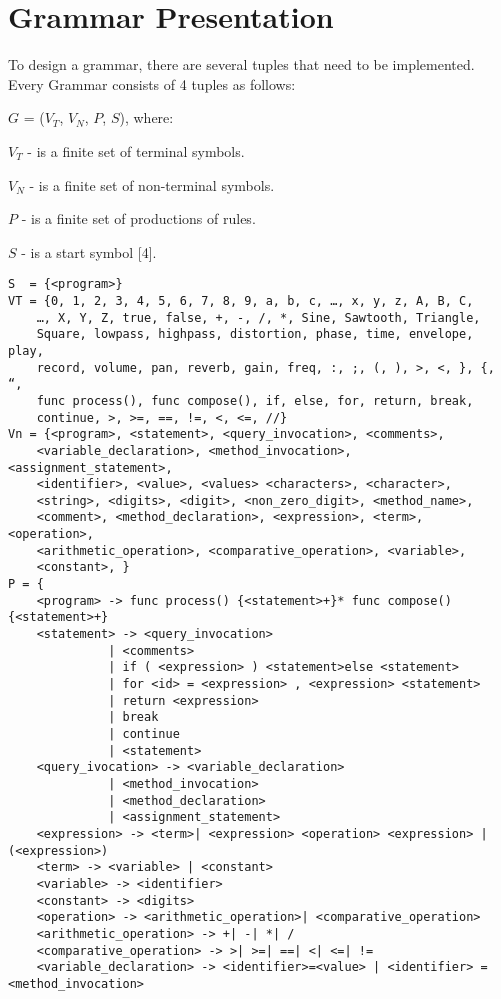 \chapter{Grammar Presentation}
To design a grammar, there are several tuples that need to be implemented. Every Grammar consists of 4 tuples as follows:

$G$ = ($V_T$, $V_N$, $P$, $S$), where:

$V_T$ - is a finite set of terminal symbols.

$V_N$ - is a finite set of non-terminal symbols.

$P$ - is a finite set of productions of rules. 

$S$ - is a start symbol [4].

\begin{verbatim}
S  = {<program>}
VT = {0, 1, 2, 3, 4, 5, 6, 7, 8, 9, a, b, c, …, x, y, z, A, B, C, 
    …, X, Y, Z, true, false, +, -, /, *, Sine, Sawtooth, Triangle, 
    Square, lowpass, highpass, distortion, phase, time, envelope, play, 
    record, volume, pan, reverb, gain, freq, :, ;, (, ), >, <, }, {, “, 
    func process(), func compose(), if, else, for, return, break, 
    continue, >, >=, ==, !=, <, <=, //}
Vn = {<program>, <statement>, <query_invocation>, <comments>, 
    <variable_declaration>, <method_invocation>, <assignment_statement>, 
    <identifier>, <value>, <values> <characters>, <character>, 
    <string>, <digits>, <digit>, <non_zero_digit>, <method_name>, 
    <comment>, <method_declaration>, <expression>, <term>, <operation>, 
    <arithmetic_operation>, <comparative_operation>, <variable>, 
    <constant>, }
P = {
    <program> -> func process() {<statement>+}* func compose() {<statement>+}
    <statement> -> <query_invocation>
              | <comments>
              | if ( <expression> ) <statement>else <statement>
              | for <id> = <expression> , <expression> <statement>
              | return <expression> 
              | break  
              | continue 
              | <statement>
    <query_ivocation> -> <variable_declaration> 
              | <method_invocation> 
              | <method_declaration>
              | <assignment_statement>
    <expression> -> <term>| <expression> <operation> <expression> | (<expression>)
    <term> -> <variable> | <constant>
    <variable> -> <identifier>
    <constant> -> <digits>
    <operation> -> <arithmetic_operation>| <comparative_operation>
    <arithmetic_operation> -> +| -| *| /
    <comparative_operation> -> >| >=| ==| <| <=| !=
    <variable_declaration> -> <identifier>=<value> | <identifier> = <method_invocation>

\end{verbatim}

